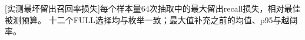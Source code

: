 \par\medskip\noindent\begin{minipage}{\linewidth}
\centering\captionsetup{hypcap=false}
[实测最坏留出召回率损失]{每个样本量64次抽取中的最大留出recall损失，相对最佳被测预算。
十二个FULL选择均与枚举一致；最大值补充之前的均值、p95与越阈率。}
\label{tab:7-budget-tails}
\footnotesize\setlength{\tabcolsep}{4pt}

\end{minipage}\par\medskip
